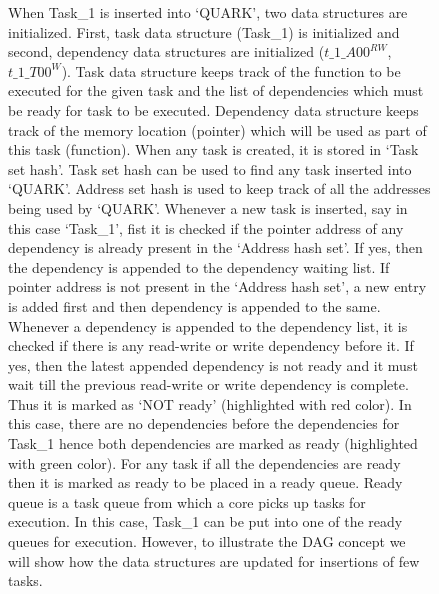 \documentclass{article}
\begin{document}
\begin{figure}
\begin{minipage}{1.0\linewidth}
When Task\_1 is inserted into `QUARK', two data structures are initialized. First, task data structure (Task\_1) is initialized and second, dependency data structures are initialized ($t\_1\_A00^{RW}$, $t\_1\_T00^{W}$). Task data structure keeps track of the function to be executed for the given task and the list of dependencies which must be ready for task to be executed. Dependency data structure keeps track of the memory location (pointer) which will be used as part of this task (function). When any task is created, it is stored in `Task set hash'. Task set hash can be  used to find any task inserted into `QUARK'. Address set hash is used to keep track of all the addresses being used by `QUARK'. Whenever a new task is inserted, say in this case `Task\_1', fist it is checked if the pointer address of any dependency is already present in the `Address hash set'. If yes, then the dependency is appended to the dependency waiting list. If pointer address is not present in the `Address hash set', a new entry is added first and then dependency is appended to the same. Whenever a dependency is appended to the dependency list, it is checked if there is any read-write or write dependency before it. If yes, then the latest appended dependency is not ready and it must wait till the previous read-write or write dependency is complete. Thus it is marked as `NOT ready' (highlighted with red color). In this case, there are no dependencies before the dependencies for Task\_1 hence both dependencies are marked as ready (highlighted with green color). For any task if all the dependencies are ready then it is marked as ready to be placed in a ready queue. Ready queue  is a task queue from which a core picks up tasks for execution. In this case, Task\_1 can be put into one of the ready queues for execution. However, to illustrate the DAG concept we will show how the data structures are updated for insertions of few tasks.

\end{minipage}

\end{figure}
\end{document}
